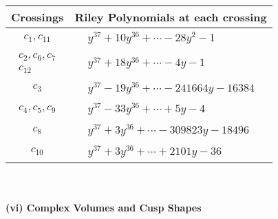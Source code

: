 \documentclass[1p]{elsarticle_modified}
\theoremstyle{definition}
\begin{document}
\begin{tabular}{m{50pt}|m{274pt}}
Crossings & \hspace{64pt}Riley Polynomials at each crossing \\
\hline $$\begin{aligned}c_{1},c_{11}\end{aligned}$$&$\begin{aligned}
&y^{37}+10 y^{36}+\cdots-28 y^2-1
\end{aligned}$\\
\hline $$\begin{aligned}c_{2},c_{6},c_{7}\\c_{12}\end{aligned}$$&$\begin{aligned}
&y^{37}+18 y^{36}+\cdots-4 y-1
\end{aligned}$\\
\hline $$\begin{aligned}c_{3}\end{aligned}$$&$\begin{aligned}
&y^{37}-19 y^{36}+\cdots-241664 y-16384
\end{aligned}$\\
\hline $$\begin{aligned}c_{4},c_{5},c_{9}\end{aligned}$$&$\begin{aligned}
&y^{37}-33 y^{36}+\cdots+5 y-4
\end{aligned}$\\
\hline $$\begin{aligned}c_{8}\end{aligned}$$&$\begin{aligned}
&y^{37}+3 y^{36}+\cdots-309823 y-18496
\end{aligned}$\\
\hline $$\begin{aligned}c_{10}\end{aligned}$$&$\begin{aligned}
&y^{37}+3 y^{36}+\cdots+2101 y-36
\end{aligned}$\\
\hline
\end{tabular}\\~\\
\newpage\flushleft \textbf{(vi) Complex Volumes and Cusp Shapes}
\end{document}
